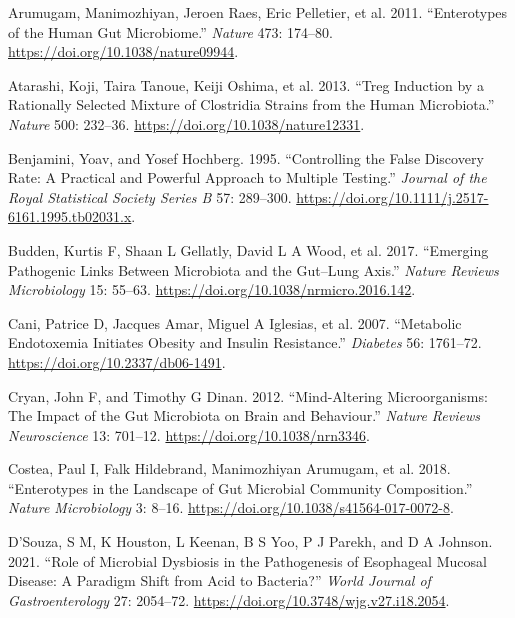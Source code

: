\documentclass[
  11pt,
]{article}
\newlength{\cslhangindent}
\newenvironment{CSLReferences}[2] %
 {\begin{list}{}{%
  \setlength{\itemindent}{0pt}
  \setlength{\leftmargin}{0pt}
  \setlength{\parsep}{0pt}
  \ifodd #1
   \setlength{\leftmargin}{\cslhangindent}
   \setlength{\itemindent}{-1\cslhangindent}
  \fi
  \setlength{\itemsep}{#2\baselineskip}}}
 {\end{list}}
\begin{document}
\protect{}\label{refs}
\begin{CSLReferences}{1}{0}
Arumugam, Manimozhiyan, Jeroen Raes, Eric Pelletier, et al. 2011.
{``Enterotypes of the Human Gut Microbiome.''} \emph{Nature} 473:
174--80. \url{https://doi.org/10.1038/nature09944}.

Atarashi, Koji, Taira Tanoue, Keiji Oshima, et al. 2013. {``Treg
Induction by a Rationally Selected Mixture of {C}lostridia Strains from
the Human Microbiota.''} \emph{Nature} 500: 232--36.
\url{https://doi.org/10.1038/nature12331}.

Benjamini, Yoav, and Yosef Hochberg. 1995. {``Controlling the False
Discovery Rate: A Practical and Powerful Approach to Multiple
Testing.''} \emph{Journal of the Royal Statistical Society Series B} 57:
289--300. \url{https://doi.org/10.1111/j.2517-6161.1995.tb02031.x}.

Budden, Kurtis F, Shaan L Gellatly, David L A Wood, et al. 2017.
{``Emerging Pathogenic Links Between Microbiota and the Gut--Lung
Axis.''} \emph{Nature Reviews Microbiology} 15: 55--63.
\url{https://doi.org/10.1038/nrmicro.2016.142}.

Cani, Patrice D, Jacques Amar, Miguel A Iglesias, et al. 2007.
{``Metabolic Endotoxemia Initiates Obesity and Insulin Resistance.''}
\emph{Diabetes} 56: 1761--72. \url{https://doi.org/10.2337/db06-1491}.

Cryan, John F, and Timothy G Dinan. 2012. {``Mind-Altering
Microorganisms: The Impact of the Gut Microbiota on Brain and
Behaviour.''} \emph{Nature Reviews Neuroscience} 13: 701--12.
\url{https://doi.org/10.1038/nrn3346}.

Costea, Paul I, Falk Hildebrand, Manimozhiyan Arumugam, et al. 2018.
{``Enterotypes in the Landscape of Gut Microbial Community
Composition.''} \emph{Nature Microbiology} 3: 8--16.
\url{https://doi.org/10.1038/s41564-017-0072-8}.

D'Souza, S M, K Houston, L Keenan, B S Yoo, P J Parekh, and D A Johnson.
2021. {``Role of Microbial Dysbiosis in the Pathogenesis of Esophageal
Mucosal Disease: A Paradigm Shift from Acid to Bacteria?''} \emph{World
Journal of Gastroenterology} 27: 2054--72.
\url{https://doi.org/10.3748/wjg.v27.i18.2054}.


\end{CSLReferences}
\end{document}
